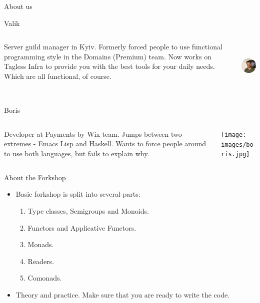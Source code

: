 \documentclass[presentation,aspectratio=169,smaller]{beamer}
\begin{document}
\begin{frame}[label={sec:org5d49515}]{About us}
\vspace*{20px}

\begin{block}{Valik}
\begin{columns}
\begin{column}{0.75\columnwidth}
Server guild manager in Kyiv. Formerly forced people to use functional
programming style in the Domains (Premium) team. Now works on Tagless Infra to
provide you with the best tools for your daily needs. Which are all functional,
of course.
\end{column}

\begin{column}{0.25\columnwidth}
\begin{center}
\includegraphics[height=2.5cm]{images/valik.png}
\end{center}

\pause
\end{column}
\end{columns}
\end{block}

\begin{block}{Boris}
\begin{columns}
\begin{column}{0.75\columnwidth}
Developer at Payments by Wix team. Jumps between two extremes - Emacs Lisp and
Haskell. Wants to force people around to use both languages, but fails to
explain why.
\end{column}

\begin{column}{0.25\columnwidth}
\begin{center}
\texttt{[image: images/boris.jpg]}
\end{center}
\end{column}
\end{columns}
\end{block}
\end{frame}

\begin{frame}[label={sec:org67c96d9}]{About the Forkshop}
\begin{itemize}
\item Basic forkshop is split into several parts:
\begin{enumerate}
\item Type classes, Semigroups and Monoids.
\item Functors and Applicative Functors.
\item Monads.
\item Readers.
\item Comonads.
\end{enumerate}
\item Theory and practice. Make sure that you are ready to write the code.
\end{itemize}
\end{frame}
\end{document}
